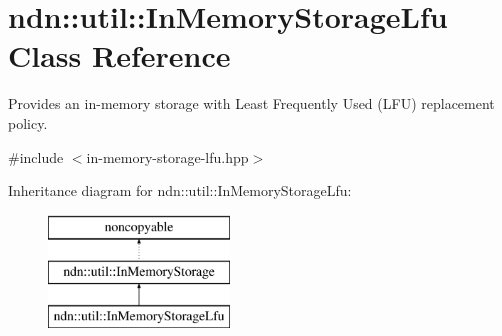 \hypertarget{classndn_1_1util_1_1InMemoryStorageLfu}{}\section{ndn\+:\+:util\+:\+:In\+Memory\+Storage\+Lfu Class Reference}
\label{classndn_1_1util_1_1InMemoryStorageLfu}


Provides an in-\/memory storage with Least Frequently Used (L\+FU) replacement policy.  




{\ttfamily \#include $<$in-\/memory-\/storage-\/lfu.\+hpp$>$}

Inheritance diagram for ndn\+:\+:util\+:\+:In\+Memory\+Storage\+Lfu\+:\begin{figure}[H]
\begin{center}
\leavevmode
\includegraphics[height=3.000000cm]{classndn_1_1util_1_1InMemoryStorageLfu}
\end{center}
\end{figure}
